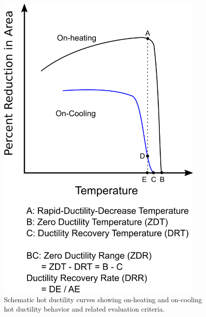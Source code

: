\begin{figure}
    \centering
    \includegraphics[width=4in]{figures/hot-ductility/schematic-hot-ductility-curves.png}
    \caption{Schematic hot ductility curves showing on-heating and on-cooling hot ductility behavior and related evaluation criteria.}
    \label{fig:schematic-hot-ductility-curves}
\end{figure}

